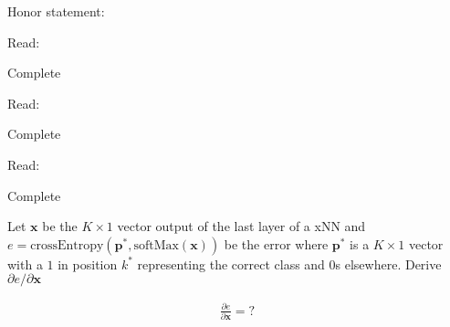 \documentclass[11pt]{article}
\newcommand{\pd}{\partial}
\begin{document}
Honor statement:
\newline

\noindent
Read:
\begin{solution}
	Complete
\end{solution}

Read:
\begin{solution}
	Complete
\end{solution}

Read:
\begin{solution}
	Complete
\end{solution}

Let $\boldsymbol{x}$ be the $K \times 1$ vector output of the last layer of a
xNN and
$e = \text{crossEntropy}(\boldsymbol{p}^*,\text{softMax}(\boldsymbol{x}))$
be the error where $\boldsymbol{p}^*$ is a $K \times 1$ vector with a $1$ in
position $k^*$ representing the correct class and $0$s elsewhere. Derive
$\pd e/ \pd\boldsymbol{x}$

\begin{solution}
	\begin{align}
		\frac{\partial e}{\partial \boldsymbol{x}} = \text{?}
	\end{align}
\end{solution}
\end{document}
